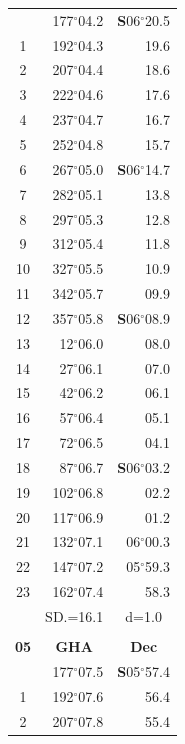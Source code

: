 \documentclass[10pt, a4paper]{report}
\begin{document}
\begin{scriptsize}
\begin{tabular*}{0.2\textwidth}[t]{@{\extracolsep{\fill}}|c|rr|}
\hline\rule{0pt}{2.6ex}\noindent
0 & 177$^\circ$04.2 & \textbf{S}06$^\circ$20.5\\
1 & 192$^\circ$04.3 & 19.6\\
2 & 207$^\circ$04.4 & 18.6\\
3 & 222$^\circ$04.6 & \raisebox{0.24ex}{\boldmath$\cdot$~\boldmath$\cdot$~~}17.6\\
4 & 237$^\circ$04.7 & 16.7\\
5 & 252$^\circ$04.8 & 15.7\\[2Pt]
6 & 267$^\circ$05.0 & \textbf{S}06$^\circ$14.7\\
7 & 282$^\circ$05.1 & 13.8\\
8 & 297$^\circ$05.3 & 12.8\\
9 & 312$^\circ$05.4 & \raisebox{0.24ex}{\boldmath$\cdot$~\boldmath$\cdot$~~}11.8\\
10 & 327$^\circ$05.5 & 10.9\\
11 & 342$^\circ$05.7 & 09.9\\[2Pt]
12 & 357$^\circ$05.8 & \textbf{S}06$^\circ$08.9\\
13 & 12$^\circ$06.0 & 08.0\\
14 & 27$^\circ$06.1 & 07.0\\
15 & 42$^\circ$06.2 & \raisebox{0.24ex}{\boldmath$\cdot$~\boldmath$\cdot$~~}06.1\\
16 & 57$^\circ$06.4 & 05.1\\
17 & 72$^\circ$06.5 & 04.1\\[2Pt]
18 & 87$^\circ$06.7 & \textbf{S}06$^\circ$03.2\\
19 & 102$^\circ$06.8 & 02.2\\
20 & 117$^\circ$06.9 & 01.2\\
21 & 132$^\circ$07.1 & 06$^\circ$00.3\\
22 & 147$^\circ$07.2 & 05$^\circ$59.3\\
23 & 162$^\circ$07.4 & 58.3\\
\hline
\rule{0pt}{2.4ex} & \multicolumn{1}{c}{SD.=16.1} & \multicolumn{1}{c|}{d=1.0}\\
\hline
\multicolumn{1}{c}{}\\[-0.5ex]\hline
\multicolumn{1}{|c|}{\rule{0pt}{2.6ex}\textbf{05}} & \multicolumn{1}{c}{\textbf{GHA}} & \multicolumn{1}{c|}{\textbf{Dec}}\\
\hline\rule{0pt}{2.6ex}\noindent
0 & 177$^\circ$07.5 & \textbf{S}05$^\circ$57.4\\
1 & 192$^\circ$07.6 & 56.4\\
2 & 207$^\circ$07.8 & 55.4\\

\end{tabular*}
\end{scriptsize}
\end{document}
